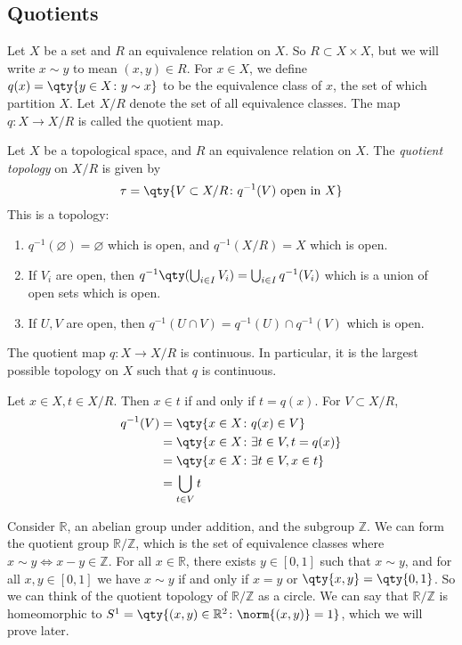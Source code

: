 \subsection{Quotients}
Let \( X \) be a set and \( R \) an equivalence relation on \( X \).
So \( R \subset X \times X \), but we will write \( x \sim y \) to mean \( (x,y) \in R \).
For \( x \in X \), we define \( q(x) = \qty{y \in X \colon y \sim x} \) to be the equivalence class of \( x \), the set of which partition \( X \).
Let \( X / R \) denote the set of all equivalence classes.
The map \( q \colon X \to X/R \) is called the quotient map.
\begin{definition}
	Let \( X \) be a topological space, and \( R \) an equivalence relation on \( X \).
	The \textit{quotient topology} on \( X/R \) is given by
	\[
		\tau = \qty{V \subset X/R \colon q^{-1}(V) \text{ open in } X }
	\]
	This is a topology:
	\begin{enumerate}
		\item \( q^{-1}(\varnothing) = \varnothing \) which is open, and \( q^{-1}(X/R) = X \) which is open.
		\item If \( V_i \) are open, then \( q^{-1}\qty(\bigcup_{i \in I} V_i) = \bigcup_{i \in I} q^{-1}(V_i) \) which is a union of open sets which is open.
		\item If \( U, V \) are open, then \( q^{-1}(U \cap V) = q^{-1}(U) \cap q^{-1}(V) \) which is open.
	\end{enumerate}
\end{definition}
\begin{remark}
	The quotient map \( q \colon X \to X/R \) is continuous.
	In particular, it is the largest possible topology on \( X \) such that \( q \) is continuous.

	Let \( x \in X, t \in X/R \).
	Then \( x \in t \) if and only if \( t = q(x) \).
	For \( V \subset X/R \),
	\begin{align*}
		q^{-1}(V) &= \qty{x \in X \colon q(x) \in V} \\
		&= \qty{x \in X \colon \exists t \in V, t = q(x)} \\
		&= \qty{x \in X \colon \exists t \in V, x \in t} \\
		&= \bigcup_{t \in V} t
	\end{align*}
\end{remark}
\begin{example}
	Consider \( \mathbb R \), an abelian group under addition, and the subgroup \( \mathbb Z \).
	We can form the quotient group \( \mathbb R / \mathbb Z \), which is the set of equivalence classes where \( x \sim y \iff x - y \in \mathbb Z \).
	For all \( x \in \mathbb R \), there exists \( y \in [0,1] \) such that \( x \sim y \), and for all \( x, y \in [0,1] \) we have \( x \sim y \) if and only if \( x = y \) or \( \qty{x,y} = \qty{0,1} \).
	So we can think of the quotient topology of \( \mathbb R / \mathbb Z \) as a circle.
	We can say that \( \mathbb R / \mathbb Z \) is homeomorphic to \( S^1 = \qty{(x,y) \in \mathbb R^2 \colon \norm{(x,y)} = 1} \), which we will prove later.
\end{example}
